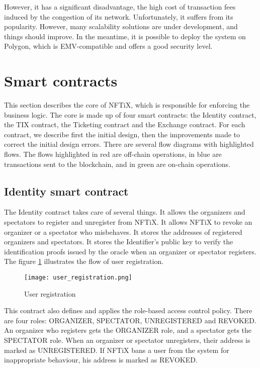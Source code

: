 \documentclass[a4paper,11pt,oneside]{report}
\begin{document}
However, it has a significant disadvantage, the high cost of transaction fees induced by the congestion of its network. Unfortunately, it suffers from its popularity. However, many scalability solutions are under development, and things should improve. In the meantime, it is possible to deploy the system on Polygon, which is EMV-compatible and offers a good security level.

\section{Smart contracts}
This section describes the core of NFTiX, which is responsible for enforcing the business logic. The core is made up of four smart contracts: the Identity contract, the TIX contract, the Ticketing contract and the Exchange contract. For each contract, we describe first the initial design, then the improvements made to correct the initial design errors. There are several flow diagrams with highlighted flows. The flows highlighted in red are off-chain operations, in blue are transactions sent to the blockchain, and in green are on-chain operations.

\subsection{Identity smart contract}
The Identity contract takes care of several things. It allows the organizers and spectators to register and unregister from NFTiX. It allows NFTiX to revoke an organizer or a spectator who misbehaves. It stores the addresses of registered organizers and spectators. It stores the Identifier's public key to verify the identification proofs issued by the oracle when an organizer or spectator registers. The figure \hyperref[fig:user_registration]{\ref{fig:user_registration}} illustrates the flow of user registration.

\begin{figure}[h!]
  \texttt{[image: user\_registration.png]}
  \caption{User registration}
  \label{fig:user_registration}
\end{figure}

This contract also defines and applies the role-based access control policy. There are four roles: ORGANIZER, SPECTATOR, UNREGISTERED and REVOKED. An organizer who registers gets the ORGANIZER role, and a spectator gets the SPECTATOR role. When an organizer or spectator unregisters, their address is marked as UNREGISTERED. If NFTiX bans a user from the system for inappropriate behaviour, his address is marked as REVOKED. 
\end{document}
